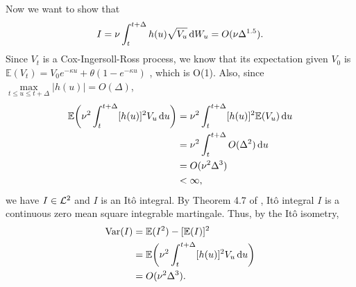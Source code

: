 \documentclass{ws-ijfe}
\begin{document}
Now we want to show that $$I =\nu\int_{t}^{t+\Delta}h(u)\sqrt{V_u}\,\mathrm{d} W_u=O(\nu\Delta^{1.5}).$$
Since $V_t$ is a Cox-Ingersoll-Ross process, we know that its expectation given $V_0$ is $\mathbb{E}(V_t)=V_0 e^{-\kappa u}+\theta(1-e^{-\kappa u})$ \cite{Dufresne2001}, which is O(1). Also, since $\max\limits_{t\leq u\leq t+\Delta}|h(u)|=O(\Delta)$,
\begin{equation*}
\begin{split}
\mathbb{E}\bigg(\nu^2 \int_{t}^{t+\Delta}[h(u)]^2 V_u\,\mathrm{d} u\bigg)  &=\nu^2\int_{t}^{t+\Delta}[h(u)]^2 \mathbb{E}(V_u)\,\mathrm{d} u\\
&=\nu^2\int_{t}^{t+\Delta}O(\Delta^2)\,\mathrm{d} u\\
&=O(\nu^2\Delta^3)\\
&<\infty,
\end{split}
\end{equation*}
we have $I\in\mathcal{L}^2$ and $I$ is an It\^o integral.
By Theorem 4.7 of \cite{Klebaner2005}, It\^o integral $I$ is a continuous zero mean square integrable martingale.   Thus, by the It\^o isometry,
\begin{align*}
  \text{Var}(I)&= \mathbb{E}(I^2)-[\mathbb{E}(I)]^2 \\
  &= \mathbb{E}\bigg(\nu^2 \int_{t}^{t+\Delta}[h(u)]^2 V_u\,\mathrm{d} u\bigg)\\
&=O(\nu^2\Delta^3).
\end{align*}
\end{document}
